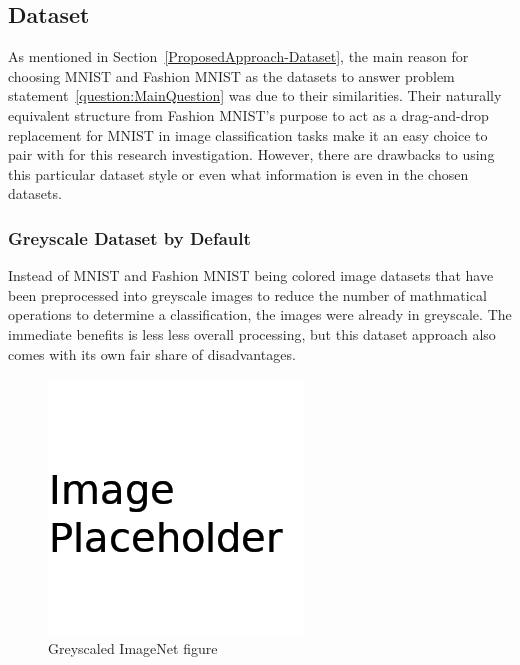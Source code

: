 \documentclass[conference]{IEEEtran}
\begin{document}
\subsection{Dataset}\label{Shortcomings-Dataset}


As mentioned in Section~\ref{ProposedApproach-Dataset}, the main reason for
choosing MNIST and Fashion MNIST as the datasets to answer problem
statement~\ref{question:MainQuestion} was due to their similarities. Their
naturally equivalent structure from Fashion MNIST's purpose to act as a
drag-and-drop replacement for MNIST in image classification tasks make it an
easy choice to pair with for this research investigation. However, there are
drawbacks to using this particular dataset style or even what information is
even in the chosen datasets.


\subsubsection{Greyscale Dataset by Default}

Instead of MNIST and Fashion MNIST being colored image datasets that have been
preprocessed into greyscale images to reduce the number of mathmatical
operations to determine a classification, the images were already in greyscale.
The immediate benefits is less less overall processing, but this dataset
approach also comes with its own fair share of disadvantages.



\begin{figure}[H]
  \centering
  \includegraphics[width=0.8\linewidth]{figures/placeholder.png}
  \caption{Greyscaled ImageNet figure~\cite{imagenet2012}}%
  \label{fig:GreysclaeImageNetExample}
\end{figure}
\end{document}
